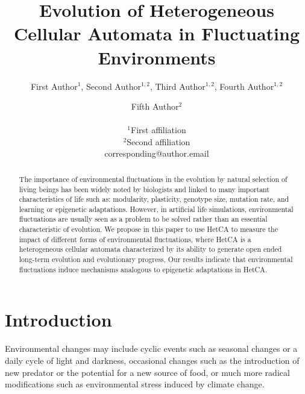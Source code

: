 \documentclass[letterpaper]{article}
\title{Evolution of Heterogeneous Cellular Automata in Fluctuating Environments}
\author{First Author$^{1}$, Second Author$^{1,2}$, Third Author$^{1,2}$, Fourth Author$^{1,2}$ \and Fifth Author$^2$ \\
\mbox{}\\
$^1$First affiliation  \\
$^2$Second affiliation \\
corresponding@author.email}
\begin{document}
\maketitle

\begin{abstract}
The importance of environmental fluctuations in the evolution by natural selection of living beings has been widely noted by biologists and linked to many important characteristics of life such as: modularity, plasticity, genotype size, mutation rate, and learning or epigenetic adaptations. However, in artificial life simulations, environmental fluctuations are usually seen as a problem to be solved rather than an essential characteristic of evolution. We propose in this paper to use HetCA to measure the impact of different forms of environmental fluctuations, where HetCA is a heterogeneous cellular automata characterized by its ability to generate open ended long-term evolution and evolutionary progress, Our results indicate that environmental fluctuations induce mechanisms analogous to epigenetic adaptations in HetCA.
\end{abstract}



\section{Introduction}\label{secintro}
Environmental changes may include cyclic events such as seasonal changes or a daily cycle of light and darkness, occasional changes such as the introduction of new predator or the potential for a new source of food, or much more radical modifications such as environmental stress induced by climate change.
\end{document}
